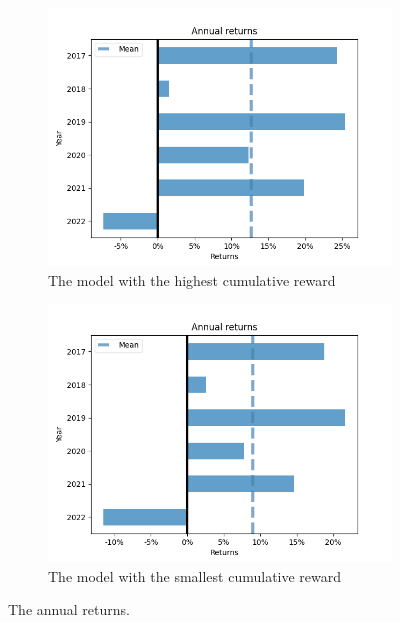 \documentclass[../xlapes02]{subfiles}
\begin{document}
    \begin{figure}[h!]
        \centering
        \begin{subfigure}[b]{\experimentimgwidth\textwidth}
            \centering
            \includegraphics[width=\linewidth]{image/figure/annual_returns_max}
            \caption{The model with the highest cumulative reward}
        \end{subfigure}
        \hfill
        \begin{subfigure}{\experimentimgwidth\textwidth}
            \centering
            \includegraphics[width=\linewidth]{image/figure/annual_returns_min}
            \caption{The model with the smallest cumulative reward}
        \end{subfigure}
        \caption{The annual returns.}
        \label{fig:Annual returns}
    \end{figure}
\end{document}
